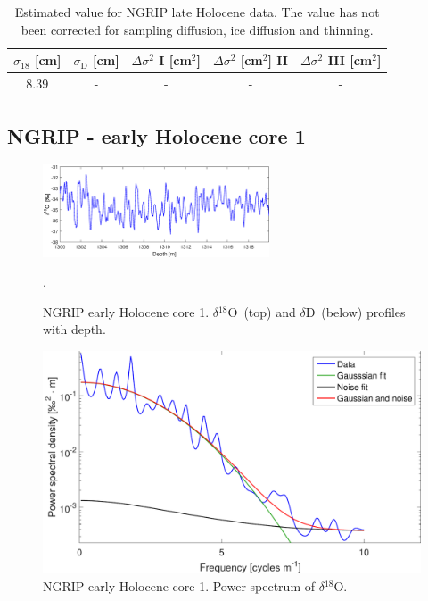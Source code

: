 \documentclass[11pt, draftcls, onecolumn]{IEEEtran} %
\numberwithin{equation}{section}
\numberwithin{table}{section}
\numberwithin{figure}{section}
\newcommand{\delOx}{$\delta{}^{18}\mathrm{O}$}
\newcommand{\delD}{$\delta\mathrm{D}$}
\begin{document}
\begin{appendices}
\begin{table}[H]
	\center
	\caption{Estimated value for NGRIP late Holocene data.
		The value has not been corrected for sampling diffusion, ice diffusion and thinning.}
	\label{NGRIP_late_holo_diff1}
	\begin{tabular}{c c c c c} 
		\toprule
		$\sigma_{18}$ [cm] & $\sigma_\mathrm{D}$ [cm] & $\Delta\sigma^2$ I [cm$^2$] & $\Delta\sigma^2$ [cm$^2$] II & $\Delta\sigma^2$ III [cm$^2$] \\
		\midrule
		8.39 &   - &    - &     - &     - \\
		\bottomrule		
	\end{tabular}
\end{table}


\clearpage
\subsection{NGRIP - early Holocene core 1}

\begin{figure}[H]
	\vspace*{2mm}
	\begin{center}
		\includegraphics[width=0.6\textwidth]{NGRIP_early_1}
		\caption{NGRIP early Holocene core 1. \delOx~(top) and \delD~(below) profiles with depth.}  \label{fig:NGRIP_early_1}.
	\end{center}
\end{figure}

\begin{figure}[H]
	\vspace*{2mm}
	\begin{center}
		\includegraphics[width=.5\textwidth]{Figure_35}
		\caption{NGRIP early Holocene core 1. Power spectrum of \delOx.}  \label{fig:NGRIP_early1}
	\end{center}
\end{figure}


\end{appendices}
\end{document}
